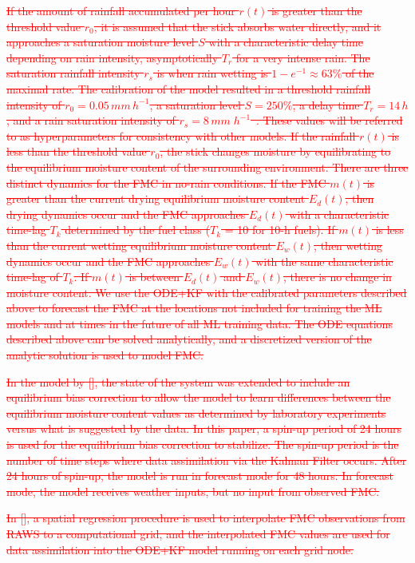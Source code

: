 \documentclass[fire,article,submit,pdftex,moreauthors]{Definitions/mdpi}
\begin{document}
\textcolor{red}{\sout{If the amount of rainfall accumulated per hour $r(t)$ is greater than the threshold value $r_0$, it is assumed that the stick absorbs water directly, and it approaches a saturation moisture level $S$ with a characteristic delay time depending on rain intensity, asymptotically $T_r$ for a very intense rain. The saturation rainfall intensity $r_s$ is when rain wetting is $1-e^{-1}\approx 63\%$ of the maximal rate. The calibration of the model resulted in a threshold rainfall intensity of $r_0=0.05 \, mm\,h^{-1}$, a saturation level $S=250\%$, a delay time $T_r = 14\,h$, and a rain saturation intensity of $r_s=8 \,mm\;h^{-1}$~\citep{Mandel-2014-RAA}. These values will be referred to as hyperparameters for consistency with other models. If the rainfall $r(t)$ is less than the threshold value $r_0$, the stick changes moisture by equilibrating to the equilibrium moisture content of the surrounding environment. There are three distinct dynamics for the FMC in no-rain conditions. If the FMC $m(t)$ is greater than the current drying equilibrium moisture content $E_d(t)$, then drying dynamics occur and the FMC approaches $E_d(t)$ with a characteristic time-lag $T_k$ determined by the fuel class ($T_k$ = 10 for 10-h fuels). If $m(t)$ is less than the current wetting equilibrium moisture content $E_w(t)$, then wetting dynamics occur and the FMC approaches $E_w(t)$ with the same characteristic time-lag of $T_k$. If $m(t)$ is between $E_d(t)$ and $E_w(t)$, there is no change in moisture content. We use the ODE+KF with the calibrated parameters described above to forecast the FMC at the locations not included for training the ML models and at times in the future of all ML training data. The ODE equations described above can be solved analytically, and a discretized version of the analytic solution is used to model FMC.}}

\textcolor{red}{\sout{In the model by [], the state of the system was extended to include an equilibrium bias correction to allow the model to learn differences between the equilibrium moisture content values as determined by laboratory experiments versus what is suggested by the data. In this paper, a spin-up period of 24 hours is used for the equilibrium bias correction to stabilize. The spin-up period is the number of time steps where data assimilation via the Kalman Filter occurs. After 24 hours of spin-up, the model is run in forecast mode for 48 hours. In forecast mode, the model receives weather inputs, but no input from observed FMC.}} 

\textcolor{red}{\sout{In [], a spatial regression procedure is used to interpolate FMC observations from RAWS to a computational grid, and the interpolated FMC values are used for data assimilation into the ODE+KF model running on each grid node.}} 
\end{document}
